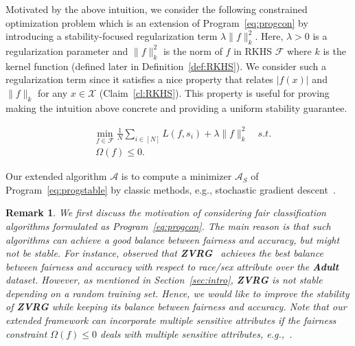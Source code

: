 \documentclass[11pt]{article}
\newtheorem{remark}[theorem]{Remark}
\newcommand{\calA}{\mathcal{A}}
\newcommand{\calF}{\mathcal{F}}
\newcommand{\calX}{\mathcal{X}}
\begin{document}
	Motivated by the above intuition, we consider the following constrained optimization problem which is an extension of Program~\eqref{eq:progcon} by introducing a stability-focused regularization term $\lambda\|f\|_k^2$. 
	Here, $\lambda>0$ is a regularization parameter and $\|f\|_k^2$ is the norm of $f$ in RKHS $\calF$ where $k$ is the kernel function (defined later in Definition~\ref{def:RKHS}).
	We consider such a regularization term since it satisfies a nice property  that relates $|f(x)|$ and $\|f\|_k$ for any $x\in \calX$ (Claim~\ref{cl:RKHS}).
	This property is useful for proving making the intuition above concrete and providing a uniform stability guarantee.
	
	\begin{tcolorbox}
		\begin{equation} \tag{Stable-Fair}
		\label{eq:progstable}
		\begin{split}
		& \min_{f\in \calF} \frac{1}{N} \sum_{i\in [N]} L(f,s_i) + \lambda \|f\|_k^2 \quad s.t. \\
		& ~ \Omega(f)\leq 0.
		\end{split}
		\end{equation}
	\end{tcolorbox}
	
	\noindent
	Our extended algorithm $\calA$ is to compute a minimizer $\calA_S$ of Program~\eqref{eq:progstable} by classic methods, e.g., stochastic gradient descent~\cite{boyd2008stochastic}.
	
	\begin{remark}
		\label{remark:confair}
		We first discuss the motivation of considering fair classification algorithms formulated as Program~\eqref{eq:progcon}. 
		The main reason is that such algorithms can achieve a good balance between fairness and accuracy, but might not be stable.
		For instance, \cite{friedler2018comparative} observed that \textbf{ZVRG}~\cite{zafar2017fairness} achieves the best balance between fairness and accuracy with respect to race/sex attribute over the \textbf{Adult} dataset.
		However, as mentioned in Section~\ref{sec:intro}, \textbf{ZVRG} is not stable depending on a random training set. 
		Hence, we would like to improve the stability of \textbf{ZVRG} while keeping its balance between fairness and accuracy.
		Note that our extended framework can incorporate  multiple sensitive attributes if the fairness constraint $\Omega(f)\leq 0$ deals with multiple sensitive attributes, e.g.,~\cite{zafar2017fair,zafar2017fairness,goel2018non}.
	\end{remark}
	
\end{document}
